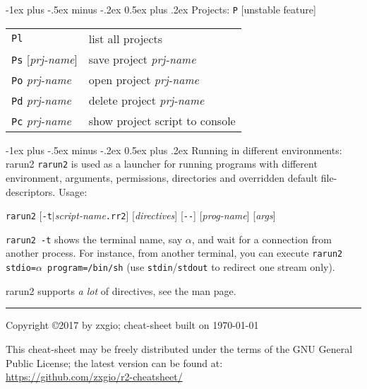 \documentclass[a4paper,landscape]{article}
\makeatletter
\renewcommand{\section}{\@startsection{section}{1}{0mm}%
                                {-1ex plus -.5ex minus -.2ex}%
                                {0.5ex plus .2ex}%
                                {\normalfont\large\bfseries}}
\makeatother
\begin{document}
\begin{multicols*}{3}
\section{Projects: \texttt{P} [unstable feature]}
\begin{tabular}{@{}ll@{}}
\texttt{Pl} & list all projects \\
\texttt{Ps} [\textit{prj-name}] & save project \textit{prj-name} \\
\texttt{Po} \textit{prj-name} & open project \textit{prj-name} \\
\texttt{Pd} \textit{prj-name} & delete project \textit{prj-name} \\
\texttt{Pc} \textit{prj-name} & show project script to console \\
\end{tabular}

\section{Running in different environments: rarun2}
\texttt{rarun2} is used as a launcher for running programs with different environment,
arguments, permissions, directories and overridden default file-descriptors.
Usage:

\texttt{rarun2} [\texttt{-t}$|$\textit{script-name}\texttt{.rr2}] [\textit{directives}] [\texttt{-{}-}] [\textit{prog-name}] [\textit{args}]

\texttt{rarun2 -t} shows the terminal name, say $\alpha$, and wait for a connection from another process. For instance, from another terminal, you can execute \texttt{rarun2 stdio=$\alpha$ program=/bin/sh} (use \texttt{stdin}/\texttt{stdout} to redirect one stream only).

rarun2 supports \emph{a lot} of directives, see the man page.


\rule{1.0\linewidth}{0.25pt}
\scriptsize
Copyright \copyright 2017 by zxgio; cheat-sheet built on \today

This cheat-sheet may be freely distributed under the terms of the GNU
General Public License; the latest version can be found at: \\
\url{https://github.com/zxgio/r2-cheatsheet/}
\end{multicols*}
\end{document}
